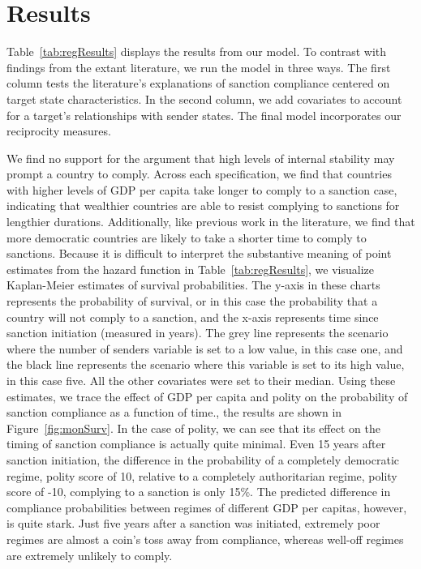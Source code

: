 \section*{Results}
\label{Results} 

Table~\ref{tab:regResults} displays the results from our model. To contrast with findings from the extant literature, we run the model in three ways. The first column tests the literature's explanations of sanction compliance centered on target state characteristics. In the second column, we add covariates to account for a target's relationships with sender states. The final model incorporates our reciprocity measures. 



We find no support for the argument that high levels of internal stability may prompt a country to comply. Across each specification, we find that countries with higher levels of GDP per capita take longer to comply to a sanction case, indicating that wealthier countries are able to resist complying to sanctions for lengthier durations. Additionally, like previous work in the literature, we find that more democratic countries are likely to take a shorter time to comply to sanctions. Because it is difficult to interpret the substantive meaning of point estimates from the hazard function in Table~\ref{tab:regResults}, we visualize Kaplan-Meier estimates of survival probabilities. The y-axis in these charts represents the probability of survival, or in this case the probability that a country will not comply to a sanction, and the x-axis represents time since sanction initiation (measured in years). The grey line represents the scenario where the number of senders variable is set to a low value, in this case one, and the black line represents the scenario where this variable is set to its high value, in this case five. All the other covariates were set to their median. Using these estimates, we trace the effect of GDP per capita and polity on the probability of sanction compliance as a function of time., the results are shown in Figure~\ref{fig:monSurv}. In the case of polity, we can see that its effect on the timing of sanction compliance is actually quite minimal. Even 15 years after sanction initiation, the difference in the probability of a completely democratic regime, polity score of 10, relative to a completely authoritarian regime, polity score of -10, complying to a sanction is only 15\%. The predicted difference in compliance probabilities between regimes of different GDP per capitas, however, is quite stark. Just five years after a sanction was initiated, extremely poor regimes are almost a coin's toss away from compliance, whereas well-off regimes are extremely unlikely to comply. 

